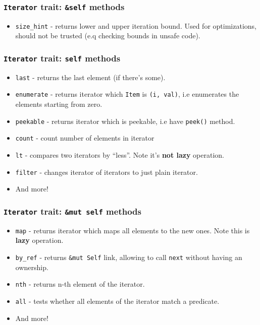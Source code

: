 \documentclass[aspectratio=1610,t]{beamer}
\begin{document}

\begin{frame}[fragile]
\frametitle{\texttt{Iterator} trait: \texttt{\&self} methods}
\begin{itemize}
    \item<1-> \texttt{size\_hint} - returns lower and upper iteration bound. Used for optimizations, should not be trusted (e.q checking bounds in unsafe code).
\end{itemize}
\end{frame}


\begin{frame}[fragile]
\frametitle{\texttt{Iterator} trait: \texttt{self} methods}
\begin{itemize}
    \item<1-> \texttt{last} - returns the last element (if there's some).
    \item<2-> \texttt{enumerate} - returns iterator which \texttt{Item} is \texttt{(i, val)}, i.e enumerates the elements starting from zero.
    \item<3-> \texttt{peekable} - returns iterator which is peekable, i.e have \texttt{peek()} method.
    \item<4-> \texttt{count} - count number of elements in iterator
    \item<5-> \texttt{lt} - compares two iterators by ``less''. Note it's \textbf{not lazy} operation.
    \item<6-> \texttt{filter} - changes iterator of iterators to just plain iterator.
    \item<6-> And more!
\end{itemize}
\end{frame}


\begin{frame}[fragile]
\frametitle{\texttt{Iterator} trait: \texttt{\&mut self} methods}
\begin{itemize}
    \item<1-> \texttt{map} - returns iterator which maps all elements to the new ones. Note this is \textbf{lazy} operation.
    \item<2-> \texttt{by\_ref} - returns \texttt{\&mut Self} link, allowing to call \texttt{next} without having an ownership.
    \item<3-> \texttt{nth} - returns n-th element of the iterator.
    \item<4-> \texttt{all} - tests whether all elements of the iterator match a predicate.
    \item<4-> And more!
\end{itemize}
\end{frame}
\end{document}
